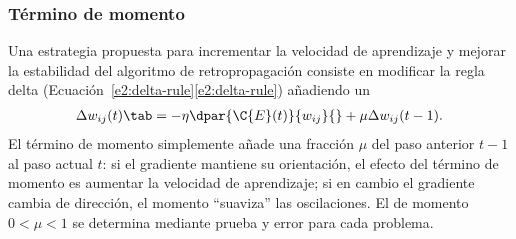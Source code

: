 %
\subsubsection{Término de momento}
%
Una estrategia propuesta para incrementar la velocidad de aprendizaje
y mejorar la estabilidad del algoritmo de retropropagación consiste en
modificar la regla delta
(\iflatexml{}Ecuación~\ref{e2:delta-rule}\else\autoref{e2:delta-rule}\fi)
añadiendo un 
%
\begin{align}\label{e2:momentum-term}
  \Delta w_{ij}(t)\tab=-\eta\dpar{\C{E}(t)}{w_{ij}}{} +\mu\Delta
  w_{ij}(t-1).
\end{align}
%
El término de momento simplemente añade una fracción $\mu$ del paso
anterior $t-1$ al paso actual $t$: si el gradiente mantiene su
orientación, el efecto del término de momento es aumentar la velocidad
de aprendizaje; si en cambio el gradiente cambia de dirección, el
momento ``suaviza'' las oscilaciones.
El \hparam{} de momento $0<\mu<1$ se determina mediante prueba y error
para cada problema.
